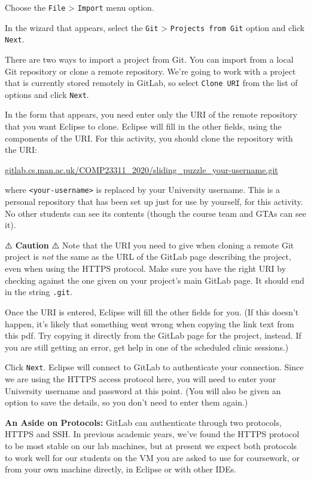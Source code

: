 \documentclass[
]{book}
\begin{document}
Choose the \texttt{File} \textgreater{} \texttt{Import} menu option.

In the wizard that appears, select the \texttt{Git} \textgreater{} \texttt{Projects\ from\ Git} option and click \texttt{Next}.

There are two ways to import a project from Git. You can import from a local Git repository or clone a remote repository. We're going to work with a project that is currently stored remotely in GitLab, so select \texttt{Clone\ URI} from the list of options and click \texttt{Next}.

In the form that appears, you need enter only the URI of the remote repository that you want Eclipse to clone. Eclipse will fill in the other fields, using the components of the URI. For this activity, you should clone the repository with the URI:

\href{https://gitlab.cs.man.ac.uk/COMP23311_2021/sliding_puzzle-your-username.git}{gitlab.cs.man.ac.uk/COMP23311\_2020/sliding\_puzzle\_your-username.git}

where \texttt{\textless{}your-username\textgreater{}} is replaced by your University username. This is a personal repository that has been set up just for use by yourself, for this activity. No other students can see its contents (though the course team and GTAs can see it).

⚠️ \textbf{Caution} ⚠️
Note that the URI you need to give when cloning a remote Git project is \emph{not} the same as the URL of the GitLab page describing the project, even when using the HTTPS protocol. Make sure you have the right URI by checking against the one given on your project's main GitLab page. It should end in the string \texttt{.git}.

Once the URI is entered, Eclipse will fill the other fields for you. (If this doesn't happen, it's likely that something went wrong when copying the link text from this pdf. Try copying it directly from the GitLab page for the project, instead. If you are still getting an error, get help in one of the scheduled clinic sessions.)

Click \texttt{Next}. Eclipse will connect to GitLab to authenticate your connection. Since we are using the HTTPS access protocol here, you will need to enter your University username and password at this point. (You will also be given an option to save the details, so you don't need to enter them again.)

\textbf{An Aside on Protocols:} GitLab can authenticate through two protocols, HTTPS and SSH. In previous academic years, we've found the HTTPS protocol to be most stable on our lab machines, but at present we expect both protocols to work well for our students on the VM you are asked to use for coursework, or from your own machine directly, in Eclipse or with other IDEs.
\end{document}
